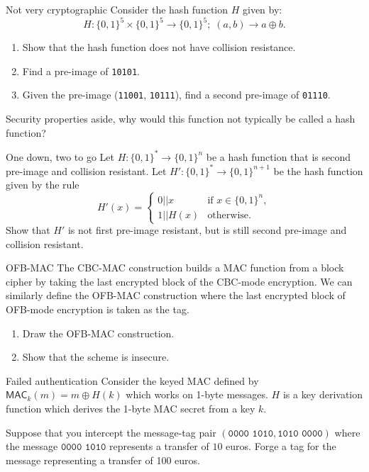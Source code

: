 \documentclass{practice}
\newcommand*{\MAC}{\mathsf{MAC}}
\begin{document}
\begin{task}{Not very cryptographic}
  Consider the hash function $H$ given by:
  \[
    H:\{0,1\}^5 \times \{0,1\}^5 \to \{0,1\}^5;\;
    (a,b) \to a \oplus b.
  \]
  \begin{enumerate}
    \item Show that the hash function does not have collision resistance.
    \item Find a pre-image of \texttt{10101}.
    \item Given the pre-image (\texttt{11001}, \texttt{10111}), find a second pre-image of \texttt{01110}.
  \end{enumerate}

  Security properties aside, why would this function not typically be called a hash function?
\end{task}

\begin{task}{One down, two to go}
  Let $H:\{0,1\}^* \to \{0,1\}^n$ be a hash function that is second pre-image and collision resistant.
  Let $H':\{0,1\}^* \to \{0,1\}^{n+1}$ be the hash function given by the rule
  \[
    H'(x) =
    \begin{cases}
      0||x&\text{if } x\in\{0,1\}^n,\\
      1||H(x)&\text{otherwise}.
    \end{cases}
  \]
  Show that $H'$ is not first pre-image resistant, but is still second pre-image and collision resistant.
\end{task}

\begin{task}{OFB-MAC}
  The CBC-MAC construction builds a MAC function from a block cipher by taking the last encrypted block of the CBC-mode encryption.
  We can similarly define the OFB-MAC construction where the last encrypted block of OFB-mode encryption is taken as the tag.
  \begin{enumerate}
    \item Draw the OFB-MAC construction.
    \item Show that the scheme is insecure.
  \end{enumerate}
\end{task}

\begin{task}{Failed authentication}
  Consider the keyed MAC defined by $\MAC_k(m) = m \oplus H(k)$ which works on 1-byte messages.
  $H$ is a key derivation function which derives the 1-byte MAC secret from a key $k$.

  Suppose that you intercept the message-tag pair $(\texttt{0000 1010}, \texttt{1010 0000})$ where the message $\texttt{0000 1010}$ represents a transfer of $10$ euros.
  Forge a tag for the message representing a transfer of 100 euros.
\end{task}
\end{document}
